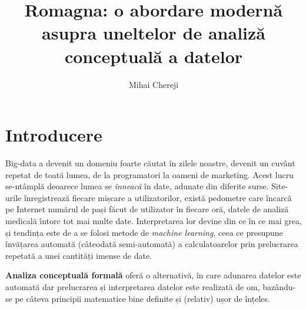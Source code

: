 \documentclass[12pt, a4paper, twoside, romanian]{teza-upb}
\begin{document}
\author{Mihai Chereji}

\title{Romagna: o abordare modernă asupra uneltelor de analiză conceptuală a datelor}




\beforepreface
\listoffigures
\listoftables
{}
\afterpreface 

\chapter*{Introducere}

  Big-data a devenit un domeniu foarte căutat în zilele noastre, devenit un cuvânt repetat de toată lumea, de la programatori la oameni de marketing. 
  Acest lucru se-ntâmplă deoarece lumea se \textit{înneacă} în date, adunate din diferite surse. Site-urile înregistrează fiecare mișcare a utilizatorilor, există pedometre care încarcă pe Internet numărul de pași făcut de utilizator în fiecare oră, datele de analiză medicală întorc tot mai multe date. 
  Interpretarea lor devine din ce în ce mai grea, și tendința este de a se folosi metode de \textit{machine learning}, ceea ce presupune învățarea automată (câteodată semi-automată) a calculatoarelor prin prelucrarea repetată a unei cantități imense de date.
  
  \textbf{Analiza conceptuală formală} oferă o alternativă, în care adunarea datelor este automată dar prelucrarea și interpretarea datelor este realizată de om, bazându-se pe câteva principii matematice bine definite și (relativ) ușor de înțeles. 
\end{document}
